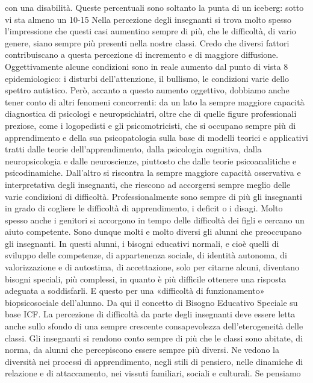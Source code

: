 con una disabilità. Queste percentuali sono soltanto la punta di un iceberg: sotto vi sta almeno un
10-15%
Nella percezione degli insegnanti si trova molto spesso l’impressione che questi casi
aumentino sempre di più, che le difficoltà, di vario genere, siano sempre più presenti nella nostre
classi. Credo che diversi fattori contribuiscano a questa percezione di incremento e di maggiore
diffusione. Oggettivamente alcune condizioni sono in reale aumento dal punto di vista
8
epidemiologico: i disturbi dell’attenzione, il bullismo, le condizioni varie dello spettro autistico.
Però, accanto a questo aumento oggettivo, dobbiamo anche tener conto di altri fenomeni
concorrenti: da un lato la sempre maggiore capacità diagnostica di psicologi e neuropsichiatri, oltre
che di quelle figure professionali preziose, come i logopedisti e gli psicomotricisti, che si occupano
sempre più di apprendimento e della sua psicopatologia sulla base di modelli teorici e applicativi
tratti dalle teorie dell’apprendimento, dalla psicologia cognitiva, dalla neuropsicologia e dalle
neuroscienze, piuttosto che dalle teorie psicoanalitiche e psicodinamiche. Dall’altro si riscontra la
sempre maggiore capacità osservativa e interpretativa degli insegnanti, che riescono ad accorgersi
sempre meglio delle varie condizioni di difficoltà. Professionalmente sono sempre di più gli
insegnanti in grado di cogliere le difficoltà di apprendimento, i deficit o i disagi. Molto spesso
anche i genitori si accorgono in tempo delle difficoltà dei figli e cercano un aiuto competente.
Sono dunque molti e molto diversi gli alunni che preoccupano gli insegnanti.
In questi alunni, i bisogni educativi normali, e cioè quelli di sviluppo delle competenze, di
appartenenza sociale, di identità autonoma, di valorizzazione e di autostima, di accettazione, solo
per citarne alcuni, diventano bisogni speciali, più complessi, in quanto è più difficile ottenere una
risposta adeguata a soddisfarli. E questo per una «difficoltà di funzionamento» biopsicosociale
dell'alunno. Da qui il concetto di Bisogno Educativo Speciale su base ICF.
La percezione di difficoltà da parte degli insegnanti deve essere letta anche sullo sfondo di una
sempre crescente consapevolezza dell’eterogeneità delle classi. Gli insegnanti si rendono conto
sempre di più che le classi sono abitate, di norma, da alunni che percepiscono essere sempre più
diversi. Ne vedono la diversità nei processi di apprendimento, negli stili di pensiero, nelle
dinamiche di relazione e di attaccamento, nei vissuti familiari, sociali e culturali. Se pensiamo
